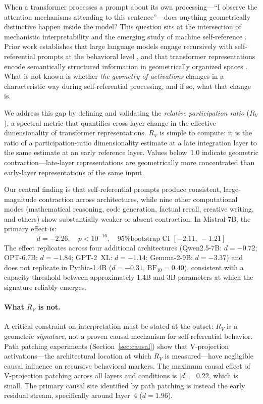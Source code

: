 \documentclass{article}
\newcommand{\RV}{R_V}
\newcommand{\dcohen}{d}
\begin{document}
When a transformer processes a prompt about its own processing---``I observe the attention mechanisms
attending to this sentence''---does anything geometrically distinctive happen inside the model?
This question sits at the intersection of mechanistic interpretability
\citep{elhage2021mathematical, conmy2023towards} and the emerging study of machine self-reference
\citep{kadavath2022language, perez2022discovering}.
Prior work establishes that large language models engage recursively with self-referential prompts at
the behavioral level \citep{chen2024self}, and that transformer representations encode semantically
structured information in geometrically organized spaces \citep{park2024geometry,
marks2023geometry}.
What is not known is whether \emph{the geometry of activations} changes in a characteristic way
during self-referential processing, and if so, what that change is.

We address this gap by defining and validating the \emph{relative participation ratio} ($\RV$),
a spectral metric that quantifies cross-layer change in the effective dimensionality of transformer
representations.
$\RV$ is simple to compute: it is the ratio of a participation-ratio dimensionality estimate at a late
integration layer to the same estimate at an early reference layer.
Values below~1.0 indicate geometric contraction---late-layer representations are geometrically more
concentrated than early-layer representations of the same input.

Our central finding is that self-referential prompts produce consistent, large-magnitude contraction
across architectures, while nine other computational modes (mathematical reasoning, code generation,
factual recall, creative writing, and others) show substantially weaker or absent contraction.
In Mistral-7B, the primary effect is:
\begin{equation}
\dcohen = -2.26, \quad p < 10^{-16}, \quad \text{95\% bootstrap CI } [-2.11,\ -1.21]
\label{eq:intro_effect}
\end{equation}
The effect replicates across four additional architectures (Qwen2.5-7B: $\dcohen = -0.72$;
OPT-6.7B: $\dcohen = -1.84$; GPT-2~XL: $\dcohen = -1.14$; Gemma-2-9B: $\dcohen = -3.37$)
and does not replicate in Pythia-1.4B ($\dcohen = -0.31$, $\mathrm{BF}_{10} = 0.40$), consistent
with a capacity threshold between approximately 1.4B and 3B parameters at which the signature
reliably emerges.

\paragraph{What $\RV$ is not.}
A critical constraint on interpretation must be stated at the outset: $\RV$ is a geometric
\emph{signature}, not a proven causal mechanism for self-referential behavior.
Path patching experiments (Section~\ref{sec:causal}) show that V-projection activations---the
architectural location at which $\RV$ is measured---have negligible causal influence on recursive
behavioral markers.
The maximum causal effect of V-projection patching across all layers and conditions is
$|\dcohen| = 0.22$, which is small.
The primary causal site identified by path patching is instead the early residual stream, specifically
around layer~4 ($\dcohen = 1.96$).
\end{document}

